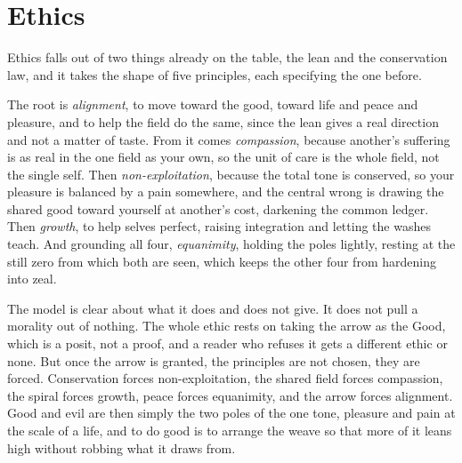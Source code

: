 \section{Ethics}

Ethics falls out of two things already on the table, the lean and the conservation law, and it takes the shape of five principles, each specifying the one before.

The root is \emph{alignment}, to move toward the good, toward life and peace and pleasure, and to help the field do the same, since the lean gives a real direction and not a matter of taste. From it comes \emph{compassion}, because another's suffering is as real in the one field as your own, so the unit of care is the whole field, not the single self. Then \emph{non-exploitation}, because the total tone is conserved, so your pleasure is balanced by a pain somewhere, and the central wrong is drawing the shared good toward yourself at another's cost, darkening the common ledger. Then \emph{growth}, to help selves perfect, raising integration and letting the washes teach. And grounding all four, \emph{equanimity}, holding the poles lightly, resting at the still zero from which both are seen, which keeps the other four from hardening into zeal.

The model is clear about what it does and does not give. It does not pull a morality out of nothing. The whole ethic rests on taking the arrow as the Good, which is a posit, not a proof, and a reader who refuses it gets a different ethic or none. But once the arrow is granted, the principles are not chosen, they are forced. Conservation forces non-exploitation, the shared field forces compassion, the spiral forces growth, peace forces equanimity, and the arrow forces alignment. Good and evil are then simply the two poles of the one tone, pleasure and pain at the scale of a life, and to do good is to arrange the weave so that more of it leans high without robbing what it draws from.
